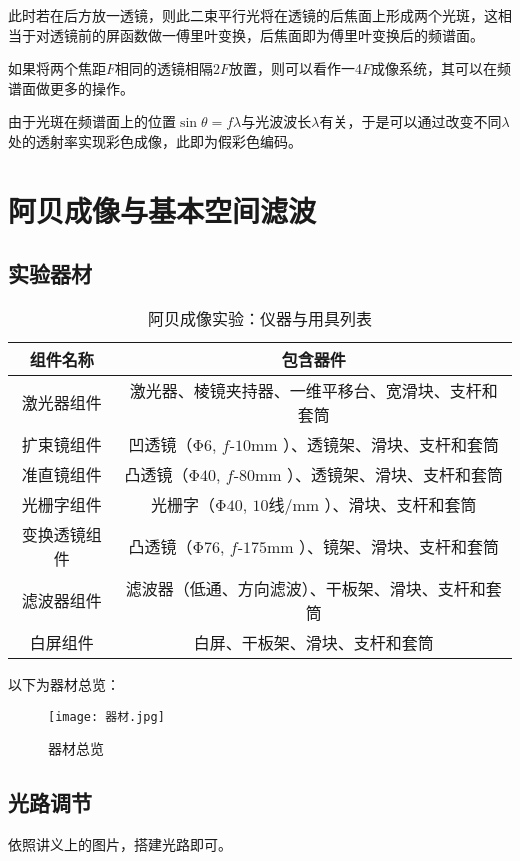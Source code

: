 \documentclass[11pt]{article}
\begin{document}
	此时若在后方放一透镜，则此二束平行光将在透镜的后焦面上形成两个光斑，这相当于对透镜前的屏函数做一傅里叶变换，后焦面即为傅里叶变换后的频谱面。
	
	如果将两个焦距$F$相同的透镜相隔$2F$放置，则可以看作一4$F$成像系统，其可以在频谱面做更多的操作。
	
	由于光斑在频谱面上的位置$\sin \theta=f \lambda$与光波波长$\lambda$有关，于是可以通过改变不同$\lambda$处的透射率实现彩色成像，此即为假彩色编码。
	
	
	
	
	\section{阿贝成像与基本空间滤波}
	
	\subsection{实验器材}
	
	\begin{table}[H]
		\centering
		\begin{tabular}{cc}
			\toprule
			组件名称 & 包含器件\\ \midrule
			激光器组件& 激光器、棱镜夹持器、一维平移台、宽滑块、支杆和套筒\\
			扩束镜组件& 凹透镜（Φ$ 6$, $f$-$10$mm ）、透镜架、滑块、支杆和套筒\\ 
			准直镜组件& 凸透镜（Φ$40$, $f$-$80$mm ）、透镜架、滑块、支杆和套筒\\ 
			光栅字组件& 光栅字（Φ$40$, $10$线/mm ）、滑块、支杆和套筒\\ 
			变换透镜组件& 凸透镜（Φ$76$, $f$-$175$mm ）、镜架、滑块、支杆和套筒\\ 
			滤波器组件& 滤波器（低通、方向滤波）、干板架、滑块、支杆和套筒\\ 
			白屏组件& 白屏、干板架、滑块、支杆和套筒\\ \bottomrule
		\end{tabular}
		\caption{阿贝成像实验：仪器与用具列表}
	\end{table}
	
	以下为器材总览：
	\begin{figure}[H]
		\centering
		\texttt{[image: 器材.jpg]}
		\caption{器材总览}
		\label{fig:instrument}
	\end{figure}
	
	\subsection{光路调节}
	依照讲义上的图片，搭建光路即可。
	
\end{document}

